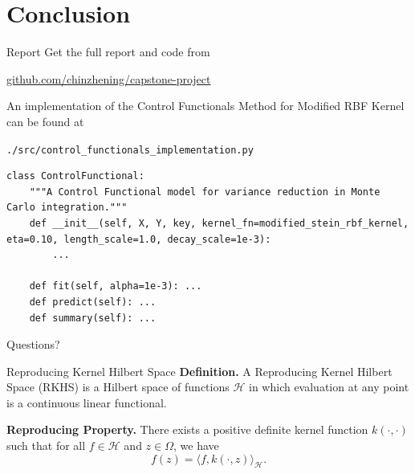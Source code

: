 \documentclass[9pt]{beamer}
\begin{document}


\section{Conclusion}

\begin{frame}[fragile]{Report}
\small
Get the full report and code from 

\begin{center}\url{github.com/chinzhening/capstone-project}\end{center}

An implementation of the Control Functionals Method for Modified RBF Kernel can be found at
\begin{center}\texttt{./src/control\_functionals\_implementation.py}
\end{center}

\begin{lstlisting}
class ControlFunctional:
    """A Control Functional model for variance reduction in Monte Carlo integration."""
    def __init__(self, X, Y, key, kernel_fn=modified_stein_rbf_kernel, eta=0.10, length_scale=1.0, decay_scale=1e-3):
        ...

    def fit(self, alpha=1e-3): ...
    def predict(self): ...
    def summary(self): ...
\end{lstlisting}
\end{frame}

{
\begin{frame}[standout]
    Questions?
\end{frame}
}

\appendix

\begin{frame}[fragile]{Reproducing Kernel Hilbert Space}
\small
\textbf{Definition.} A Reproducing Kernel Hilbert Space (RKHS) is a Hilbert space of functions $\mathcal{H}$
in which evaluation at any point is a continuous linear functional.

\textbf{Reproducing Property.} There exists a positive definite kernel function $k(\cdot, \cdot)$ such that for all $f \in \mathcal{H}$ and $z \in \Omega$, we have
$$f(z) = \langle f, k(\cdot, z) \rangle_\mathcal{H}.$$
\end{frame}
\end{document}
